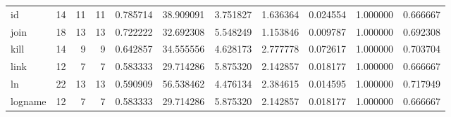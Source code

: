 \begin{tabular}{lrrrrrrrrrr}
id        &                                      14 &                 11 &                                11 &                                   0.785714 &                              38.909091 &                                     3.751827 &                          1.636364 &                                0.024554 &                           1.000000 &                                           0.666667 \\
join      &                                      18 &                 13 &                                13 &                                   0.722222 &                              32.692308 &                                     5.548249 &                          1.153846 &                                0.009787 &                           1.000000 &                                           0.692308 \\
kill      &                                      14 &                  9 &                                 9 &                                   0.642857 &                              34.555556 &                                     4.628173 &                          2.777778 &                                0.072617 &                           1.000000 &                                           0.703704 \\
link      &                                      12 &                  7 &                                 7 &                                   0.583333 &                              29.714286 &                                     5.875320 &                          2.142857 &                                0.018177 &                           1.000000 &                                           0.666667 \\
ln        &                                      22 &                 13 &                                13 &                                   0.590909 &                              56.538462 &                                     4.476134 &                          2.384615 &                                0.014595 &                           1.000000 &                                           0.717949 \\
logname   &                                      12 &                  7 &                                 7 &                                   0.583333 &                              29.714286 &                                     5.875320 &                          2.142857 &                                0.018177 &                           1.000000 &                                           0.666667 \\

\end{tabular}
